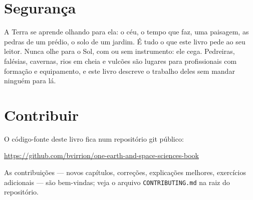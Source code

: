 \section*{Segurança}

A Terra se aprende olhando para ela: o céu, o tempo que faz, uma
paisagem, as pedras de um prédio, o solo de um jardim. É tudo o que este
livro pede ao seu leitor. Nunca olhe para o Sol, com ou sem instrumento:
ele cega. Pedreiras, falésias, cavernas, rios em cheia e vulcões são
lugares para profissionais com formação e equipamento, e este livro
descreve o trabalho deles sem mandar ninguém para lá.

\section*{Contribuir}

O código-fonte deste livro fica num repositório git público:
\begin{center}
\url{https://github.com/bvirrion/one-earth-and-space-sciences-book}
\end{center}
As contribuições --- novos capítulos, correções, explicações melhores,
exercícios adicionais --- são bem-vindas; veja o arquivo
\texttt{CONTRIBUTING.md} na raiz do repositório.
